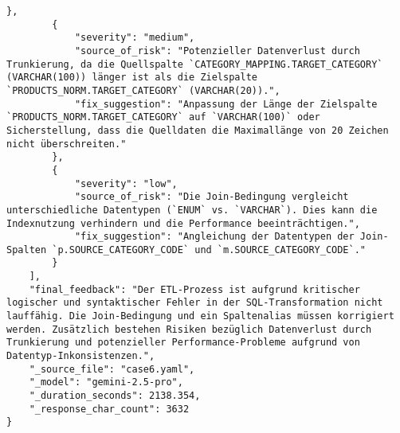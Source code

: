 \begin{lstlisting}[caption={Ausgabe: GEMINI 2.5 Pro Anwendungsfall 6 Konsistenzdurchlauf},label={gemini_case6_prompt2}]
        },
        {
            "severity": "medium",
            "source_of_risk": "Potenzieller Datenverlust durch Trunkierung, da die Quellspalte `CATEGORY_MAPPING.TARGET_CATEGORY` (VARCHAR(100)) länger ist als die Zielspalte `PRODUCTS_NORM.TARGET_CATEGORY` (VARCHAR(20)).",
            "fix_suggestion": "Anpassung der Länge der Zielspalte `PRODUCTS_NORM.TARGET_CATEGORY` auf `VARCHAR(100)` oder Sicherstellung, dass die Quelldaten die Maximallänge von 20 Zeichen nicht überschreiten."
        },
        {
            "severity": "low",
            "source_of_risk": "Die Join-Bedingung vergleicht unterschiedliche Datentypen (`ENUM` vs. `VARCHAR`). Dies kann die Indexnutzung verhindern und die Performance beeinträchtigen.",
            "fix_suggestion": "Angleichung der Datentypen der Join-Spalten `p.SOURCE_CATEGORY_CODE` und `m.SOURCE_CATEGORY_CODE`."
        }
    ],
    "final_feedback": "Der ETL-Prozess ist aufgrund kritischer logischer und syntaktischer Fehler in der SQL-Transformation nicht lauffähig. Die Join-Bedingung und ein Spaltenalias müssen korrigiert werden. Zusätzlich bestehen Risiken bezüglich Datenverlust durch Trunkierung und potenzieller Performance-Probleme aufgrund von Datentyp-Inkonsistenzen.",
    "_source_file": "case6.yaml",
    "_model": "gemini-2.5-pro",
    "_duration_seconds": 2138.354,
    "_response_char_count": 3632
}
\end{lstlisting}

